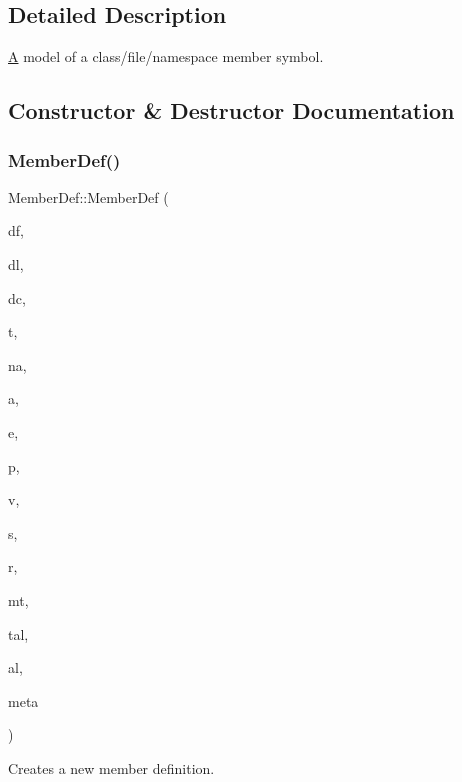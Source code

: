 \subsection{Detailed Description}
\mbox{\hyperlink{class_a}{A}} model of a class/file/namespace member symbol. 

\subsection{Constructor \& Destructor Documentation}
\mbox{\label{class_member_def_ad309cc9f07a9268c5071c24d167e2c74}} 
\subsubsection{\texorpdfstring{MemberDef()}{MemberDef()}}
{\footnotesize\ttfamily Member\+Def\+::\+Member\+Def (\begin{DoxyParamCaption}\item[{const char $\ast$}]{df,  }\item[{int}]{dl,  }\item[{int}]{dc,  }\item[{const char $\ast$}]{t,  }\item[{const char $\ast$}]{na,  }\item[{const char $\ast$}]{a,  }\item[{const char $\ast$}]{e,  }\item[{\mbox{\hyperlink{types_8h_a90e352184df58cd09455fe9996cd4ded}{Protection}}}]{p,  }\item[{\mbox{\hyperlink{types_8h_ab16236bdd10ddf4d73a9847350f0017e}{Specifier}}}]{v,  }\item[{bool}]{s,  }\item[{\mbox{\hyperlink{types_8h_a9d625fe894d9313ec78df1d78553f32e}{Relationship}}}]{r,  }\item[{Member\+Type}]{mt,  }\item[{const \mbox{\hyperlink{class_argument_list}{Argument\+List}} $\ast$}]{tal,  }\item[{const \mbox{\hyperlink{class_argument_list}{Argument\+List}} $\ast$}]{al,  }\item[{const char $\ast$}]{meta }\end{DoxyParamCaption})}

Creates a new member definition.


